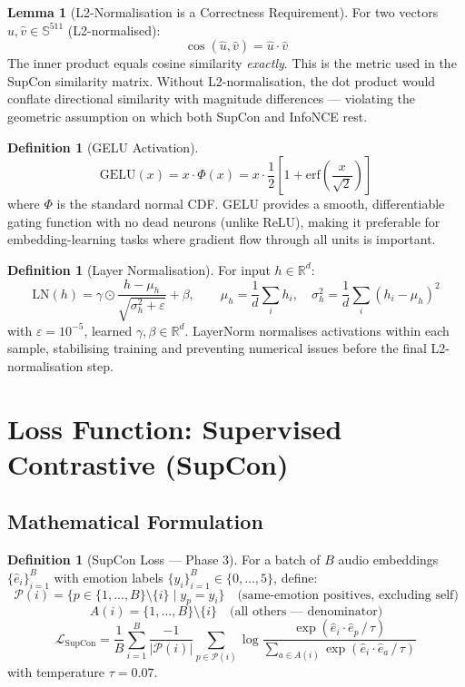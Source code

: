 \documentclass[12pt,a4paper]{article}
\theoremstyle{definition}
\newtheorem{lemma}[theorem]{Lemma}
\newtheorem{definition}[theorem]{Definition}
\theoremstyle{remark}
\begin{document}
\begin{lemma}[L2-Normalisation is a Correctness Requirement]
For two vectors $\hat{u}, \hat{v} \in \mathbb{S}^{511}$ (L2-normalised):
\[
  \cos(\hat{u}, \hat{v}) = \hat{u} \cdot \hat{v}
\]
The inner product equals cosine similarity \emph{exactly}.
This is the metric used in the SupCon similarity matrix.
Without L2-normalisation, the dot product would conflate directional
similarity with magnitude differences — violating the geometric
assumption on which both SupCon and InfoNCE rest.
\end{lemma}

\begin{definition}[GELU Activation]
\[
  \text{GELU}(x) = x \cdot \Phi(x) = x \cdot \frac{1}{2}
  \left[1 + \text{erf}\!\left(\frac{x}{\sqrt{2}}\right)\right]
\]
where $\Phi$ is the standard normal CDF.
GELU provides a smooth, differentiable gating function with no dead
neurons (unlike ReLU), making it preferable for embedding-learning tasks
where gradient flow through all units is important.
\end{definition}

\begin{definition}[Layer Normalisation]
For input $h \in \mathbb{R}^d$:
\[
  \text{LN}(h) = \gamma \odot
  \frac{h - \mu_h}{\sqrt{\sigma_h^2 + \varepsilon}} + \beta, \qquad
  \mu_h = \frac{1}{d}\sum_i h_i, \quad
  \sigma_h^2 = \frac{1}{d}\sum_i (h_i - \mu_h)^2
\]
with $\varepsilon = 10^{-5}$, learned $\gamma, \beta \in \mathbb{R}^d$.
LayerNorm normalises activations within each sample, stabilising training
and preventing numerical issues before the final L2-normalisation step.
\end{definition}

\section{Loss Function: Supervised Contrastive (SupCon)}

\subsection{Mathematical Formulation}

\begin{definition}[SupCon Loss — Phase 3]
For a batch of $B$ audio embeddings $\{\hat{e}_i\}_{i=1}^B$
with emotion labels $\{y_i\}_{i=1}^B \in \{0,\ldots,5\}$, define:
\[
  \mathcal{P}(i) = \{p \in \{1,\ldots,B\} \setminus \{i\} \mid y_p = y_i\}
  \quad\text{(same-emotion positives, excluding self)}
\]
\[
  A(i) = \{1,\ldots,B\} \setminus \{i\}
  \quad\text{(all others — denominator)}
\]
\[
  \boxed{
  \mathcal{L}_{\text{SupCon}} =
  \frac{1}{B}\sum_{i=1}^{B} \frac{-1}{|\mathcal{P}(i)|}
  \sum_{p \in \mathcal{P}(i)}
  \log\frac{\exp(\hat{e}_i \cdot \hat{e}_p\,/\,\tau)}
           {\displaystyle\sum_{a \in A(i)} \exp(\hat{e}_i \cdot \hat{e}_a\,/\,\tau)}
  }
\]
with temperature $\tau = 0.07$.
\end{definition}
\end{document}
